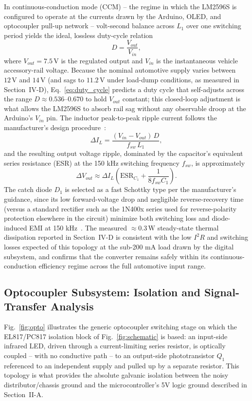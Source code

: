 \documentclass[journal, twocolumn]{IEEEtran}
\begin{document}
In continuous-conduction mode (CCM) -- the regime in which the LM2596S is configured to operate at the currents drawn by the Arduino, OLED, and optocoupler pull-up network -- volt-second balance across $L_1$ over one switching period yields the ideal, lossless duty-cycle relation
\begin{equation}
D = \frac{V_{out}}{V_{in}},
\label{eq:duty_cycle}
\end{equation}
where $V_{out} = 7.5\,\text{V}$ is the regulated output and $V_{in}$ is the instantaneous vehicle accessory-rail voltage. Because the nominal automotive supply varies between $12\,\text{V}$ and $14\,\text{V}$ (and sags to $11.2\,\text{V}$ under load-dump conditions, as measured in Section~IV-D), Eq.~\eqref{eq:duty_cycle} predicts a duty cycle that self-adjusts across the range $D \approx 0.536$--$0.670$ to hold $V_{out}$ constant; this closed-loop adjustment is what allows the LM2596S to absorb rail sag without any observable droop at the Arduino's $V_{in}$ pin. The inductor peak-to-peak ripple current follows the manufacturer's design procedure~\cite{lm2596datasheet}:
\begin{equation}
\Delta I_L = \frac{(V_{in}-V_{out})\,D}{f_{sw}\,L_1},
\label{eq:ripple_current}
\end{equation}
and the resulting output voltage ripple, dominated by the capacitor's equivalent series resistance (ESR) at the 150 kHz switching frequency $f_{sw}$, is approximately
\begin{equation}
\Delta V_{out} \approx \Delta I_L \left(\text{ESR}_{C_1} + \frac{1}{8 f_{sw} C_1}\right).
\label{eq:ripple_voltage}
\end{equation}
The catch diode $D_1$ is selected as a fast Schottky type per the manufacturer's guidance, since its low forward-voltage drop and negligible reverse-recovery time (versus a standard rectifier such as the 1N400x series used for reverse-polarity protection elsewhere in the circuit) minimize both switching loss and diode-induced EMI at 150 kHz~\cite{lm2596datasheet}. The measured $\approx 0.3\,\text{W}$ steady-state thermal dissipation reported in Section~IV-D is consistent with the low $I^2R$ and switching losses expected of this topology at the sub-200 mA load drawn by the digital subsystem, and confirms that the converter remains safely within its continuous-conduction efficiency regime across the full automotive input range.

\subsection{Optocoupler Subsystem: Isolation and Signal-Transfer Analysis}
\label{sec:opto}
Fig.~\ref{fig:opto} illustrates the generic optocoupler switching stage on which the EL817/PC817 isolation block of Fig.~\ref{fig:schematic} is based: an input-side infrared LED, driven through a current-limiting series resistor, is optically coupled -- with no conductive path -- to an output-side phototransistor $Q_1$ referenced to an independent supply and pulled up by a separate resistor. This topology is what provides the absolute galvanic isolation between the noisy distributor/chassis ground and the microcontroller's 5V logic ground described in Section~II-A.
\end{document}
